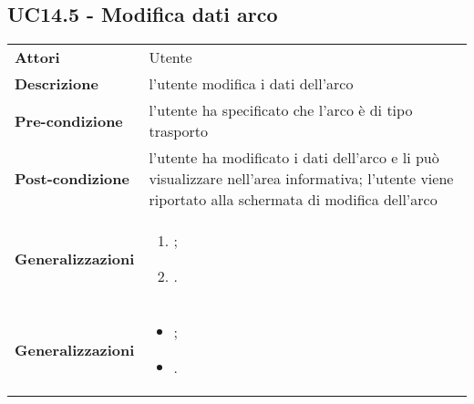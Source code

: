 \subsection{UC14.5 - Modifica dati arco} 
\label{sssec:UC14.5} 
\def\arraystretch{1.5}
\begin{tabularx}{\textwidth}{l|p{}}
	\rowcolor{I} \multicolumn{2}{c}{\color{white}\textbf{UC14.5 - Modifica dati arco}} \\
	\toprule
	\endhead
	\textbf{Attori} & Utente\\
	\textbf{Descrizione} & l'utente modifica i dati dell'arco\\
	\textbf{Pre-condizione} & l'utente ha specificato che l'arco è di tipo trasporto\\
	\textbf{Post-condizione} & l'utente ha modificato i dati dell'arco e li può visualizzare nell'area informativa; l'utente viene riportato alla schermata di modifica dell'arco\\
	\textbf{Generalizzazioni} &
	\vspace{-1.2em}\begin{enumerate}
		[leftmargin=*,noitemsep,nosep]
		\item \nameref{sssec:UC14.6};
		\item \nameref{sssec:UC14.7}.
	\end{enumerate} \\
\textbf{Generalizzazioni} &
\vspace{-1.2em}\begin{itemize}
	[leftmargin=*,noitemsep,nosep]
	\item \nameref{sssec:UC14.6};
	\item \nameref{sssec:UC14.7}.
\end{itemize} \\
	\bottomrule
\end{tabularx}


